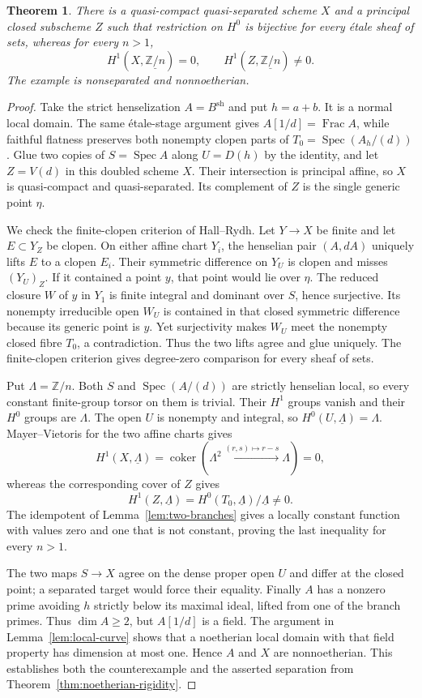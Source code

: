 \documentclass[11pt,a4paper]{article}
\newtheorem{theorem}{Theorem}[section]
\theoremstyle{definition}
\newcommand{\Spec}{\operatorname{Spec}}
\newcommand{\Z}{\mathbb Z}
\begin{document}
\begin{theorem}\label{thm:torsion-counterexample}
There is a quasi-compact quasi-separated scheme $X$ and a principal closed subscheme $Z$ such that restriction on $H^0$ is bijective for every étale sheaf of sets, whereas for every $n>1$,
\[
 H^1(X,\underline{\Z/n})=0,
 \qquad H^1(Z,\underline{\Z/n})\ne0.
\]
The example is nonseparated and nonnoetherian.
\end{theorem}
\begin{proof}
Take the strict henselization $A=B^{\mathrm{sh}}$ and put $h=a+b$. It is a normal local domain. The same étale-stage argument gives $A[1/d]=\operatorname{Frac}A$, while faithful flatness preserves both nonempty clopen parts of
$T_0=\Spec(A_h/(d))$.
Glue two copies of $S=\Spec A$ along $U=D(h)$ by the identity, and let $Z=V(d)$ in this doubled scheme $X$. Their intersection is principal affine, so $X$ is quasi-compact and quasi-separated. Its complement of $Z$ is the single generic point $\eta$.

We check the finite-clopen criterion of Hall--Rydh. Let $Y\to X$ be finite and let $E\subset Y_Z$ be clopen. On either affine chart $Y_i$, the henselian pair $(A,dA)$ uniquely lifts $E$ to a clopen $E_i$. Their symmetric difference on $Y_U$ is clopen and misses $(Y_U)_Z$. If it contained a point $y$, that point would lie over $\eta$. The reduced closure $W$ of $y$ in $Y_1$ is finite integral and dominant over $S$, hence surjective. Its nonempty irreducible open $W_U$ is contained in that closed symmetric difference because its generic point is $y$. Yet surjectivity makes $W_U$ meet the nonempty closed fibre $T_0$, a contradiction. Thus the two lifts agree and glue uniquely. The finite-clopen criterion gives degree-zero comparison for every sheaf of sets.

Put $\Lambda=\Z/n$. Both $S$ and $\Spec(A/(d))$ are strictly henselian local, so every constant finite-group torsor on them is trivial. Their $H^1$ groups vanish and their $H^0$ groups are $\Lambda$. The open $U$ is nonempty and integral, so $H^0(U,\underline\Lambda)=\Lambda$. Mayer--Vietoris for the two affine charts gives
\[
 H^1(X,\underline\Lambda)=
 \operatorname{coker}(\Lambda^2\xrightarrow{(r,s)\mapsto r-s}\Lambda)=0,
\]
whereas the corresponding cover of $Z$ gives
\[
 H^1(Z,\underline\Lambda)=
 H^0(T_0,\underline\Lambda)/\underline\Lambda\ne0.
\]
The idempotent of Lemma~\ref{lem:two-branches} gives a locally constant function with values zero and one that is not constant, proving the last inequality for every $n>1$.

The two maps $S\to X$ agree on the dense proper open $U$ and differ at the closed point; a separated target would force their equality. Finally $A$ has a nonzero prime avoiding $h$ strictly below its maximal ideal, lifted from one of the branch primes. Thus $\dim A\ge2$, but $A[1/d]$ is a field. The argument in Lemma~\ref{lem:local-curve} shows that a noetherian local domain with that field property has dimension at most one. Hence $A$ and $X$ are nonnoetherian. This establishes both the counterexample and the asserted separation from Theorem~\ref{thm:noetherian-rigidity}.
\end{proof}
\end{document}
